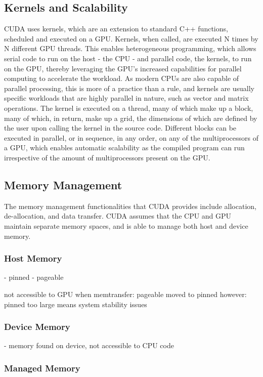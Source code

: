  
 \subsection{Kernels and Scalability}
 CUDA uses kernels, which are an extension to standard C++ functions, scheduled and executed on a GPU. Kernels, when called, are executed N times by N different GPU threads. This enables heterogeneous programming, which allows serial code to run on the host - the CPU - and parallel code, the kernels, to run on the GPU, thereby leveraging the GPU's increased capabilities for parallel computing to accelerate the workload. As modern CPUs are also capable of parallel processing, this is more of a practice than a rule, and kernels are usually specific workloads that are highly parallel in nature, such as vector and matrix operations. The kernel is executed on a thread, many of which make up a block, many of which, in return, make up a grid, the dimensions of which are defined by the user upon calling the kernel in the source code. Different blocks can be executed in parallel, or in sequence, in any order, on any of the multiprocessors of a GPU, which enables automatic scalability as the compiled program can run irrespective of the amount of multiprocessors present on the GPU.~\cite{nvidia_cuda_nodate}
 
 
 \subsection{Memory Management}
 The memory management functionalities that CUDA provides include allocation, de-allocation, and data transfer. CUDA assumes that the CPU and GPU maintain separate memory spaces, and is able to manage both host and device memory.
 
 \subsubsection{Host Memory}
 - pinned
 - pageable
 
 not accessible to GPU
 when memtransfer: pageable moved to pinned
 however: pinned too large means system stability issues

 
 \subsubsection{Device Memory}
 
 - memory found on device, not accessible to CPU code
 
 \subsubsection{Managed Memory}
 
